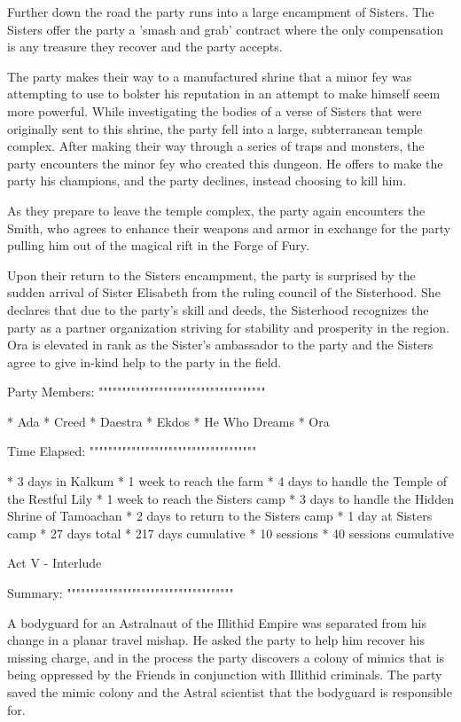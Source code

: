 Further down the road the party runs into a large encampment of Sisters.
The Sisters offer the party a 'smash and grab' contract where the only compensation is any treasure they recover and the party accepts.

The party makes their way to a manufactured shrine that a minor fey was attempting to use to bolster his reputation in an attempt to make himself seem more powerful.
While investigating the bodies of a verse of Sisters that were originally sent to this shrine, the party fell into a large, subterranean temple complex.
After making their way through a series of traps and monsters, the party encounters the minor fey who created this dungeon.
He offers to make the party his champions, and the party declines, instead choosing to kill him.

As they prepare to leave the temple complex, the party again encounters the Smith, who agrees to enhance their weapons and armor in exchange for the party pulling him out of the magical rift in the Forge of Fury.

Upon their return to the Sisters encampment, the party is surprised by the sudden arrival of Sister Elisabeth from the ruling council of the Sisterhood.
She declares that due to the party's skill and deeds, the Sisterhood recognizes the party as a partner organization striving for stability and prosperity in the region.
Ora is elevated in rank as the Sister's ambassador to the party and the Sisters agree to give in-kind help to the party in the field.

Party Members:
""""""""""""""""""""""""""""""""""""

  * Ada
  * Creed
  * Daestra
  * Ekdos
  * He Who Dreams
  * Ora

Time Elapsed:
""""""""""""""""""""""""""""""""""""

  * 3 days in Kalkum
  * 1 week to reach the farm
  * 4 days to handle the Temple of the Restful Lily
  * 1 week to reach the Sisters camp
  * 3 days to handle the Hidden Shrine of Tamoachan
  * 2 days to return to the Sisters camp
  * 1 day at Sisters camp
  * 27 days total
  * 217 days cumulative
  * 10 sessions
  * 40 sessions cumulative

Act V - Interlude
^^^^^^^^^^^^^^^^^^^^^^^^^^^^^^^^^^^^

Summary:
""""""""""""""""""""""""""""""""""""

A bodyguard for an Astralnaut of the Illithid Empire was separated from his change in a planar travel mishap.
He asked the party to help him recover his missing charge, and in the process the party discovers a colony of mimics that is being oppressed by the Friends in conjunction with Illithid criminals.
The party saved the mimic colony and the Astral scientist that the bodyguard is responsible for.

